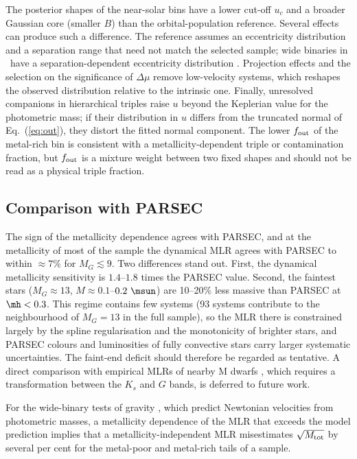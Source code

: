 The posterior shapes of the near-solar bins have a lower cut-off $u_c$ and
a broader Gaussian core (smaller $B$) than the orbital-population reference.
Several effects can produce such a difference.  The reference assumes an
eccentricity distribution and a separation range that need not match the
selected sample; wide binaries in \gaia\ have a separation-dependent
eccentricity distribution \citep{Hwang2022}.  Projection effects and the
selection on the significance of $\Delta\mu$ remove low-velocity systems,
which reshapes the observed distribution relative to the intrinsic one.
Finally, unresolved companions in hierarchical triples raise $u$ beyond the
Keplerian value for the photometric mass; if their distribution in $u$
differs from the truncated normal of Eq.~(\ref{eq:out}), they distort the
fitted normal component.  The lower $f_{\rm out}$ of the metal-rich bin is consistent with a
metallicity-dependent triple or contamination fraction, but $f_{\rm out}$ is a mixture weight between two fixed shapes and should not
be read as a physical triple fraction.

\subsection{Comparison with PARSEC}

The sign of the metallicity dependence agrees with PARSEC, and at the
metallicity of most of the sample the dynamical MLR agrees with PARSEC to
within $\approx7$\% for $M_G\lesssim9$.  Two differences stand out.  First,
the dynamical metallicity sensitivity is $1.4$--$1.8$ times the PARSEC
value.  Second, the faintest stars ($M_G\approx13$, $M\approx0.1$--$0.2~\msun$)
are 10--20\% less massive than PARSEC at $\mh<0.3$.  This regime contains few
systems (93 systems contribute to the neighbourhood of $M_G=13$ in the full
sample), so the MLR there is constrained largely by the spline
regularisation and the monotonicity of brighter stars, and PARSEC colours and luminosities of fully convective
stars carry larger systematic uncertainties.  The faint-end deficit should
therefore be regarded as tentative.  A direct comparison with empirical MLRs
of nearby M dwarfs \citep{Mann2019}, which requires a transformation between
the $K_s$ and $G$ bands, is deferred to future work.

For the wide-binary tests of gravity \citep{Chae2023,Banik2024}, which
predict Newtonian velocities from photometric masses, a metallicity dependence
of the MLR that exceeds the model prediction implies that a
metallicity-independent MLR misestimates $\sqrt{M_{\rm tot}}$ by several per
cent for the metal-poor and metal-rich tails of a sample.

